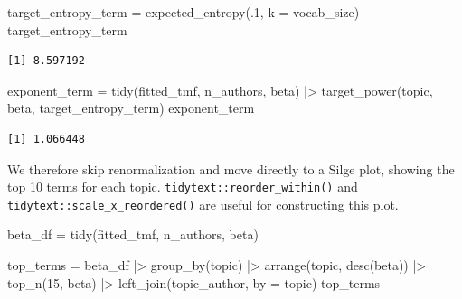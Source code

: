 \documentclass[
]{article}
\newenvironment{Shaded}{\begin{snugshade}}{\end{snugshade}}
\newcommand{\AttributeTok}[1]{\textcolor[rgb]{0.40,0.45,0.13}{#1}}
\newcommand{\DecValTok}[1]{\textcolor[rgb]{0.68,0.00,0.00}{#1}}
\newcommand{\FunctionTok}[1]{\textcolor[rgb]{0.28,0.35,0.67}{#1}}
\newcommand{\NormalTok}[1]{\textcolor[rgb]{0.00,0.23,0.31}{#1}}
\newcommand{\OtherTok}[1]{\textcolor[rgb]{0.00,0.23,0.31}{#1}}
\newcommand{\SpecialCharTok}[1]{\textcolor[rgb]{0.37,0.37,0.37}{#1}}
\newcommand{\StringTok}[1]{\textcolor[rgb]{0.13,0.47,0.30}{#1}}
\begin{document}
\begin{Shaded}
\begin{Highlighting}[]
\NormalTok{target\_entropy\_term }\OtherTok{=} \FunctionTok{expected\_entropy}\NormalTok{(.}\DecValTok{1}\NormalTok{, }\AttributeTok{k =}\NormalTok{ vocab\_size)}
\NormalTok{target\_entropy\_term}
\end{Highlighting}
\end{Shaded}

\begin{verbatim}
[1] 8.597192
\end{verbatim}

\begin{Shaded}
\begin{Highlighting}[]
\NormalTok{exponent\_term }\OtherTok{=} \FunctionTok{tidy}\NormalTok{(fitted\_tmf, n\_authors, }\StringTok{\textquotesingle{}beta\textquotesingle{}}\NormalTok{) }\SpecialCharTok{|\textgreater{}} 
    \FunctionTok{target\_power}\NormalTok{(topic, beta, target\_entropy\_term)}
\NormalTok{exponent\_term}
\end{Highlighting}
\end{Shaded}

\begin{verbatim}
[1] 1.066448
\end{verbatim}

We therefore skip renormalization and move directly to a Silge plot,
showing the top 10 terms for each topic.
\texttt{tidytext::reorder\_within()} and
\texttt{tidytext::scale\_x\_reordered()} are useful for constructing
this plot.

\begin{Shaded}
\begin{Highlighting}[]
\NormalTok{beta\_df }\OtherTok{=} \FunctionTok{tidy}\NormalTok{(fitted\_tmf, n\_authors, }\StringTok{\textquotesingle{}beta\textquotesingle{}}\NormalTok{)}

\NormalTok{top\_terms }\OtherTok{=}\NormalTok{ beta\_df }\SpecialCharTok{|\textgreater{}} 
    \FunctionTok{group\_by}\NormalTok{(topic) }\SpecialCharTok{|\textgreater{}} 
    \FunctionTok{arrange}\NormalTok{(topic, }\FunctionTok{desc}\NormalTok{(beta)) }\SpecialCharTok{|\textgreater{}} 
    \FunctionTok{top\_n}\NormalTok{(}\DecValTok{15}\NormalTok{, beta) }\SpecialCharTok{|\textgreater{}} 
    \FunctionTok{left\_join}\NormalTok{(topic\_author, }\AttributeTok{by =} \StringTok{\textquotesingle{}topic\textquotesingle{}}\NormalTok{)}
\NormalTok{top\_terms}
\end{Highlighting}
\end{Shaded}
\end{document}
